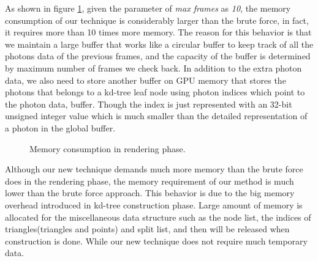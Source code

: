 As shown in figure \ref{fig:memory_consumption}, given the parameter of \emph{max frames} as \emph{10}, the memory consumption of our technique is considerably larger than the brute force, in fact, it requires more than 10 times more memory. The reason for this behavior is that we maintain a large buffer that works like a circular buffer to keep track of all the photons data of the previous frames, and the capacity of the buffer is determined by maximum number of frames we check back. In addition to the extra photon data, we also need to store another buffer on GPU memory that stores the photons that belongs to a kd-tree leaf node using photon indices which point to the photon data, buffer. Though the index is just represented with an 32-bit unsigned integer value which is much smaller than the detailed representation of a photon in the global buffer.

\begin{figure}[ftp]
    \centering
    \renewcommand{\thefigure}{\thechapter.\arabic{figure}}
    \caption[Memory consumption in rendering phase]{Memory consumption in rendering phase.}
    \label{fig:memory_consumption}
\end{figure}

Although our new technique demands much more memory than the brute force does in the rendering phase, the memory requirement of our method is much lower than the brute force approach. This behavior is due to the big memory overhead introduced in kd-tree construction phase. Large amount of memory is allocated for the miscellaneous data structure such as the node list, the indices of triangles(triangles and points) and split list, and then will be released when construction is done. While our new technique does not require much temporary data.

